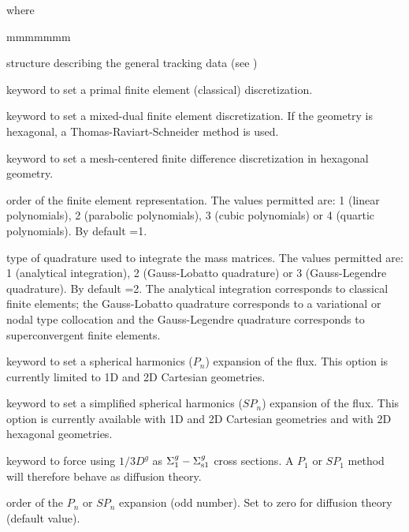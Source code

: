 \noindent where

\begin{ListeDeDescription}{mmmmmmm}

\item[\dstr{desctrack}] structure describing the general tracking data (see
)

\item[\moc{PRIM}] keyword to set a primal finite element (classical)
discretization.

\item[\moc{DUAL}] keyword to set a mixed-dual finite element discretization. If the
geometry is hexagonal, a Thomas-Raviart-Schneider method is used.

\item[\moc{MCFD}] keyword to set a mesh-centered finite difference discretization
in hexagonal geometry.

\item[\dusa{ielem}] order of the finite element representation.  The values
permitted are: 1 (linear polynomials), 2 (parabolic polynomials), 3 (cubic
polynomials) or 4 (quartic polynomials). By default =1.

\item[\dusa{icol}] type of quadrature used to integrate the mass matrices. The
values permitted are: 1 (analytical integration), 2  (Gauss-Lobatto quadrature)
or 3 (Gauss-Legendre quadrature). By default =2. The analytical
integration corresponds to classical finite elements; the Gauss-Lobatto
quadrature corresponds to a variational or nodal type collocation and the
Gauss-Legendre quadrature corresponds to superconvergent finite elements.

\item[\moc{PN}] keyword to set a spherical harmonics ($P_n$) expansion of the flux.\cite{nse2005} This option is currently limited to 1D
and 2D Cartesian geometries.

\item[\moc{SPN}] keyword to set a simplified spherical harmonics ($SP_n$) expansion
of the flux.\cite{nse2005,ane10a} This option is currently available with 1D and 2D Cartesian geometries
and with 2D hexagonal geometries.

\item[\moc{DIFF}] keyword to force using $1/3D^{g}$ as $\Sigma_1^{g}-\Sigma_{{\rm s}1}^{g}$ cross sections. A $P_1$ or $SP_1$ method
will therefore behave as diffusion theory.

\item[\dusa{nlf}] order of the $P_n$ or $SP_n$ expansion (odd number). Set to zero for diffusion theory (default value).


\end{ListeDeDescription}
